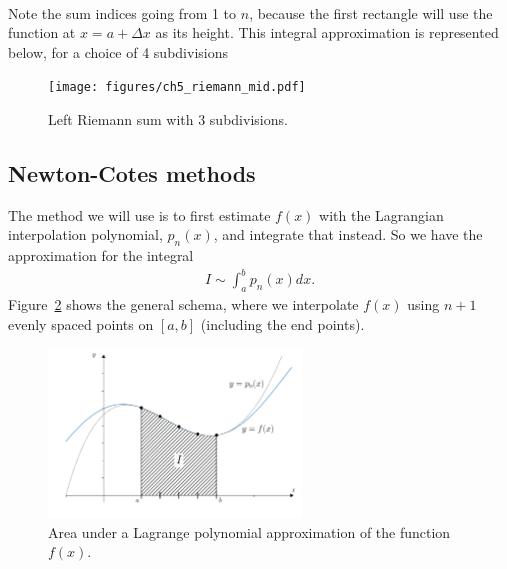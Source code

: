 \noindent {} \\
\noindent Note the sum indices going from 1 to $n$, because the first rectangle will use the function at $x = a+\Delta x$ as its height. This integral approximation is represented below, for a choice of 4 subdivisions
\begin{figure}[H]
	\begin{center}
	\texttt{[image: figures/ch5\_riemann\_mid.pdf]} 
	  \caption{Left Riemann sum with 3 subdivisions.} \label{fig:ch5_riemann_mid}
	\end{center}
\end{figure}


\subsection{Newton-Cotes methods}
The method we will use is to first estimate $f(x)$ with the Lagrangian interpolation polynomial, $p_n(x)$, and integrate that instead. So we have the approximation for the integral
\begin{align*}
I \sim \int_a^b p_n(x) dx.
\end{align*}
Figure~\ref{fig:ch5_lagrangian} shows the general schema, where we interpolate $f(x)$ using $n+1$ evenly spaced points on $[a,b]$ (including the end points).
\begin{figure}[H]
	\begin{center}
	\includegraphics[width=0.6\textwidth]{figures/ch5_lagrangian.pdf} 
	  \caption{Area under a Lagrange polynomial approximation of the function $f(x)$.} \label{fig:ch5_lagrangian}
	\end{center}
\end{figure}

